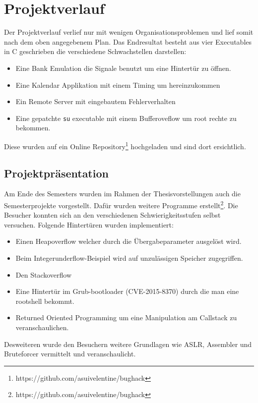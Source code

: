 \section{Projektverlauf}\label{projektverlauf}

Der Projektverlauf verlief nur mit wenigen Organisationsproblemen und
lief somit nach dem oben angegebenem Plan. Das Endresultat besteht aus
vier Executables in C geschrieben die verschiedene Schwachstellen
darstellen:

\begin{itemize}
\tightlist
\item
  Eine Bank Emulation die Signale benutzt um eine Hintertür zu öffnen.
\item
  Eine Kalendar Applikation mit einem Timing um hereinzukommen
\item
  Ein Remote Server mit eingebautem Fehlerverhalten
\item
  Eine gepatchte \texttt{su} executable mit einem Bufferoveflow um root
  rechte zu bekommen.
\end{itemize}

Diese wurden auf ein Online Repository\footnote{https://github.com/asuivelentine/bughack}
hochgeladen und sind dort ersichtlich.

\subsection{Projektpräsentation}\label{projektpruxe4sentation}

Am Ende des Semesters wurden im Rahmen der Thesisvorstellungen auch die
Semesterprojekte vorgestellt. Dafür wurden weitere Programme
erstellt\footnote{https://github.com/asuivelentine/bughack}. Die
Besucher konnten sich an den verschiedenen Schwierigkeitsstufen selbst
versuchen. Folgende Hintertüren wurden implementiert:

\begin{itemize}
\tightlist
\item
  Einen Heapoverflow welcher durch die Übergabeparameter ausgelöst wird.
\item
  Beim Integerunderflow-Beispiel wird auf unzulässigen Speicher
  zugegriffen.
\item
  Den Stackoverflow
\item
  Eine Hintertür im Grub-bootloader (CVE-2015-8370) durch die man eine
  rootshell bekommt.
\item
  Returned Oriented Programming um eine Manipulation am Callstack zu
  veranschaulichen.
\end{itemize}

Desweiteren wurde den Besuchern weitere Grundlagen wie ASLR, Assembler
und Bruteforcer vermittelt und veranschaulicht.
